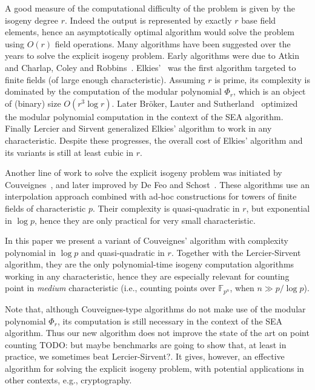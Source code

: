 \documentclass{lms}
\newcommand{\todo}[1]{{\color{red}TODO: #1}}
\newcommand{\F}{\mathbb{F}}
\begin{document}
A good measure of the computational difficulty of the problem is given
by the isogeny degree $r$. Indeed the output is represented by exactly
$r$ base field elements, hence an asymptotically optimal algorithm
would solve the problem using $O(r)$ field operations. Many algorithms
have been suggested over the years to solve the explicit isogeny
problem. Early algorithms were due to Atkin~\cite{atkin91} and
Charlap, Coley and
Robbins~\cite{charlap1991enumeration}. Elkies'~\cite{elkies92,elkies98,Bostan}
was the first algorithm targeted to finite fields (of large enough
characteristic). Assuming $r$ is prime, its complexity is dominated by
the computation of the modular polynomial $\Phi_r$, which is an object
of (binary) size $O(r^3\log r)$. Later Bröker, Lauter and
Sutherland~\cite{sutherland10:modpol} optimized the modular polynomial
computation in the context of the SEA
algorithm. Finally Lercier and Sirvent\cite{lercier+sirvent08}
generalized Elkies' algorithm to work in any characteristic. Despite
these progresses, the overall cost of Elkies' algorithm and its
variants is still at least cubic in $r$.

Another line of work to solve the explicit isogeny problem was
initiated by Couveignes~\cite{couveignes94,couveignes96,couveignes00},
and later improved by De Feo and Schost~\cite{df10,df+schost12}. These
algorithms use an interpolation approach combined with ad-hoc
constructions for towers of finite fields of characteristic $p$. Their
complexity is quasi-quadratic in $r$, but exponential in $\log p$,
hence they are only practical for very small characteristic.

In this paper we present a variant of Couveignes' algorithm with
complexity polynomial in $\log p$ and quasi-quadratic in $r$. Together
with the Lercier-Sirvent algorithm, they are the only polynomial-time
isogeny computation algorithms working in any characteristic, hence
they are especially relevant for counting point in \emph{medium}
characteristic (i.e., counting points over $\F_{p^n}$, when
$n\gg p/\log p$).

Note that, although Couveignes-type algorithms do not make use of the
modular polynomial $\Phi_r$, its computation is still necessary in the
context of the SEA algorithm. Thus our new algorithm does not improve
the state of the art on point counting \todo{but maybe benchmarks are
  going to show that, at least in practice, we sometimes beat
  Lercier-Sirvent?}. It gives, however, an effective algorithm for
solving the explicit isogeny problem, with potential applications in
other contexts, e.g., cryptography.
\end{document}
